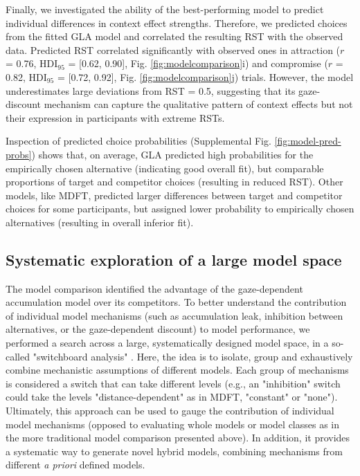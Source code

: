 \documentclass[11pt, a4paper]{article}
\begin{document}
Finally, we investigated the ability of the best-performing model to predict individual differences in context effect strengths. Therefore, we predicted choices from the fitted GLA model and correlated the resulting RST with the observed data. Predicted RST correlated significantly with observed ones in attraction ($r$ = 0.76, HDI$_{95}$ = [0.62, 0.90], Fig. \ref{fig:modelcomparison}i) and compromise ($r$ = 0.82, HDI$_{95}$ = [0.72, 0.92], Fig. \ref{fig:modelcomparison}j) trials. However, the model underestimates large deviations from RST = 0.5, suggesting that its gaze-discount mechanism can capture the qualitative pattern of context effects but not their expression in participants with extreme RSTs. 

Inspection of predicted choice probabilities (Supplemental Fig. \ref{fig:model-pred-probs}) shows that, on average, GLA predicted high probabilities for the empirically chosen alternative (indicating good overall fit), but comparable proportions of target and competitor choices (resulting in reduced RST). Other models, like MDFT, predicted larger differences between target and competitor choices for some participants, but assigned lower probability to empirically chosen alternatives (resulting in overall inferior fit).

\subsection*{Systematic exploration of a large model space}

The model comparison identified the advantage of the gaze-dependent accumulation model over its competitors. To better understand the contribution of individual model mechanisms (such as accumulation leak, inhibition between alternatives, or the gaze-dependent discount) to model performance, we performed a search across a large, systematically designed model space, in a so-called "switchboard analysis" \parencite[see][]{turner2018CompetingTheoriesMultialternative}. Here, the idea is to isolate, group and exhaustively combine mechanistic assumptions of different models. Each group of mechanisms is considered a switch that can take different levels (e.g., an "inhibition" switch could take the levels "distance-dependent" as in MDFT, "constant" or "none"). Ultimately, this approach can be used to gauge the contribution of individual model mechanisms (opposed to evaluating whole models or model classes as in the more traditional model comparison presented above). In addition, it provides a systematic way to generate novel hybrid models, combining mechanisms from different \emph{a priori} defined models.
\end{document}
